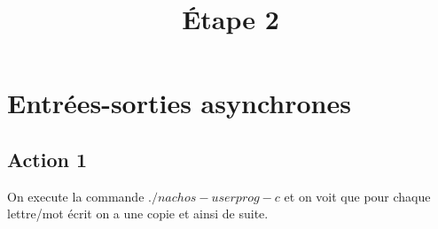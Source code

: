 \documentclass[a4paper,10pt]{article}
\title{\'Etape 2}
\author{}
\begin{document}
\maketitle

\section{Entrées-sorties asynchrones}

\subsection{Action 1}

  On execute la commande $./nachos-userprog -c$ et on voit que pour chaque lettre/mot écrit on a une copie et ainsi de suite.
\end{document}
